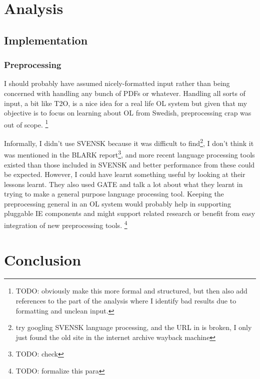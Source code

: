 \documentclass[a4paper]{report}
\newcommand{\todo}[1]{\footnote{{\color{red} TODO: #1}}}
\begin{document}
\chapter{Analysis}

\section{Implementation}

\label{chapter:analysis}

\subsection{Preprocessing}

I should probably have assumed nicely-formatted input rather than being concerned with handling any bunch of PDFs or whatever.
Handling all sorts of input, a bit like T2O, is a nice idea for a real life OL system but given that my objective is to focus on learning about OL from Swedish, preprocessing crap was out of scope. 
\todo{obviously make this more formal and structured, but then also add references to the part of the analysis where I identify bad results due to formatting and unclean input.}

Informally, I didn't use SVENSK because it was difficult to find\footnote{try googling SVENSK language processing, and the URL in \cite{Olsson98SVENSKTagging} is broken, I only just found the old site in the internet archive wayback machine}, I don't think it was mentioned in the BLARK report\todo{check}, and more recent language processing tools existed than those included in SVENSK and better performance from these could be expected.
However, I could have learnt something useful by looking at their lessons learnt.
They also used GATE and talk a lot about what they learnt in trying to make a general purpose language processing tool.
Keeping the preprocessing general in an OL system would probably help in supporting pluggable IE components and might support related research or benefit from easy integration of new preprocessing tools. \todo{formalize this para}


\chapter{Conclusion}
\end{document}
